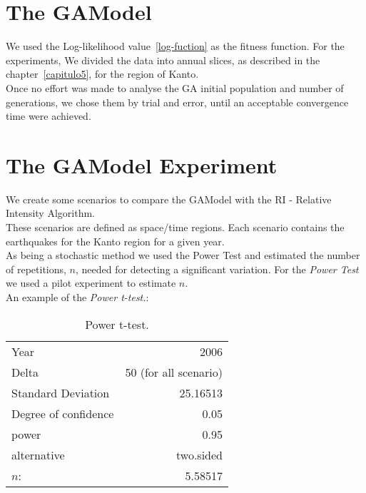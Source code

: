 \section{The GAModel}
We used the  Log-likelihood value~\ref{log-fuction} as the fitness function. For the experiments, We divided the data into annual slices, as described in the chapter~\ref{capitulo5}, for the region of Kanto.\\

Once no effort was made to analyse the GA initial population and number of generations, we chose them by trial and error, until an acceptable convergence time were achieved.\\

\section{The GAModel Experiment}
	We create some scenarios to compare the GAModel with the RI - Relative Intensity Algorithm.\\
	
	These scenarios are defined as space/time regions. Each scenario contains the earthquakes for the Kanto region for a given year.\\
	
	As being a stochastic method we used the Power Test and estimated the number of repetitions, $n$, needed for detecting a significant variation. For the  {\it Power Test} we used a pilot experiment to estimate $n$.\\
	
	An example of the  {\it Power t-test.}:

\begin{table}[!h]
  \begin{center}
  \begin{tabular}{|l|r|}
    \hline
    Year & 2006\\
    Delta & 50 (for all scenario)\\
    Standard Deviation &  25.16513\\
    Degree of confidence & 0.05\\
    power & 0.95\\
    alternative & two.sided\\
    \hline
    $n$: & 5.58517\\
    \hline    
  \end{tabular}
  \end{center}
  \caption{Power t-test.}
  \label{power}
\end{table}

